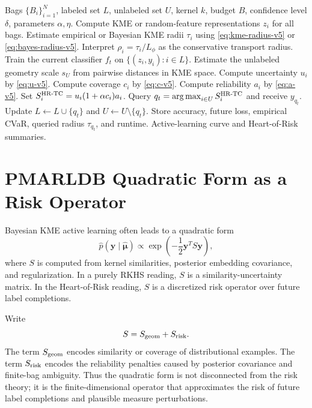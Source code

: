 \documentclass[10pt,journal]{IEEEtran}
\DeclareMathOperator*{\argmax}{arg\,max}
\begin{document}
\begin{algorithm}[t]
\caption{HR-TC-BKME-PMAL: Heart-of-Risk Transport-Calibrated Bayesian KME-PMAL}
\label{alg:hr-tc-bkme-v5}
\begin{algorithmic}[1]
\REQUIRE Bags $\{B_i\}_{i=1}^N$, labeled set $L$, unlabeled set $U$, kernel $k$, budget $B$, confidence level $\delta$, parameters $\alpha,\eta$.
\STATE Compute KME or random-feature representations $z_i$ for all bags.
\STATE Estimate empirical or Bayesian KME radii $\tau_i$ using \eqref{eq:kme-radius-v5} or \eqref{eq:bayes-radius-v5}.
\STATE Interpret $\rho_i=\tau_i/L_\phi$ as the conservative transport radius.
    \STATE Train the current classifier $f_t$ on $\{(z_i,y_i):i\in L\}$.
    \STATE Estimate the unlabeled geometry scale $s_U$ from pairwise distances in KME space.
        \STATE Compute uncertainty $u_i$ by \eqref{eq:u-v5}.
        \STATE Compute coverage $c_i$ by \eqref{eq:c-v5}.
        \STATE Compute reliability $a_i$ by \eqref{eq:a-v5}.
        \STATE Set $S_i^{\rm HR\text{-}TC}=u_i(1+\alpha c_i)a_i$.
    \ENDFOR
    \STATE Query $q_t=\argmax_{i\in U}S_i^{\rm HR\text{-}TC}$ and receive $y_{q_t}$.
    \STATE Update $L\leftarrow L\cup\{q_t\}$ and $U\leftarrow U\setminus\{q_t\}$.
    \STATE Store accuracy, future loss, empirical CVaR, queried radius $\tau_{q_t}$, and runtime.
\ENDFOR
\RETURN Active-learning curve and Heart-of-Risk summaries.
\end{algorithmic}
\end{algorithm}

\section{PMARLDB Quadratic Form as a Risk Operator}
\label{sec:quadratic-v5}

Bayesian KME active learning often leads to a quadratic form
\begin{equation}
    \widehat p(\mathbf y\mid\widehat{\bm\mu})
    \propto \exp\!\left(-\frac{1}{2}\mathbf y^T S\mathbf y\right),
\end{equation}
where $S$ is computed from kernel similarities, posterior embedding covariance, and regularization. In a purely RKHS reading, $S$ is a similarity-uncertainty matrix. In the Heart-of-Risk reading, $S$ is a discretized risk operator over future label completions.

Write
\begin{equation}
    S=S_{\rm geom}+S_{\rm risk}.
\end{equation}
The term $S_{\rm geom}$ encodes similarity or coverage of distributional examples. The term $S_{\rm risk}$ encodes the reliability penalties caused by posterior covariance and finite-bag ambiguity. Thus the quadratic form is not disconnected from the risk theory; it is the finite-dimensional operator that approximates the risk of future label completions and plausible measure perturbations.
\end{document}
